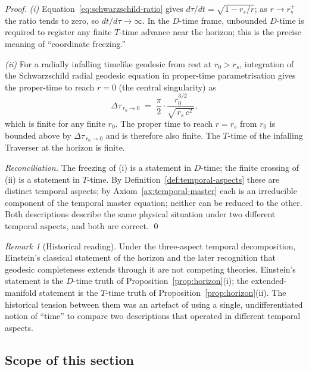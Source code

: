 \documentclass[11pt,a4paper]{article}
\theoremstyle{definition}
\theoremstyle{remark}
\newtheorem{remark}[theorem]{Remark}
\begin{document}
\begin{proof}
\emph{(i)} Equation~\eqref{eq:schwarzschild-ratio} gives $d\tau/dt = \sqrt{1 - r_{s}/r}$; as $r \to r_{s}^{+}$ the ratio tends to zero, so $dt/d\tau \to \infty$. In the $D$-time frame, unbounded $D$-time is required to register any finite $T$-time advance near the horizon; this is the precise meaning of ``coordinate freezing.''

\emph{(ii)} For a radially infalling timelike geodesic from rest at $r_{0} > r_{s}$, integration of the Schwarzschild radial geodesic equation in proper-time parametrisation gives the proper-time to reach $r=0$ (the central singularity) as
\[
\Delta\tau_{\,r_{0}\to 0} \;=\; \frac{\pi}{2}\cdot\frac{r_{0}^{3/2}}{\sqrt{\,r_{s}\,c^{2}\,}},
\]
which is finite for any finite $r_{0}$. The proper time to reach $r = r_{s}$ from $r_{0}$ is bounded above by $\Delta\tau_{\,r_{0}\to 0}$ and is therefore also finite. The $T$-time of the infalling Traverser at the horizon is finite.

\emph{Reconciliation.} The freezing of (i) is a statement in $D$-time; the finite crossing of (ii) is a statement in $T$-time. By Definition~\ref{def:temporal-aspects} these are distinct temporal aspects; by Axiom~\ref{ax:temporal-master} each is an irreducible component of the temporal master equation; neither can be reduced to the other. Both descriptions describe the same physical situation under two different temporal aspects, and both are correct. \qed
\end{proof}

\begin{remark}[Historical reading]\label{rem:horizon-historical}
Under the three-aspect temporal decomposition, Einstein's classical statement of the horizon and the later recognition that geodesic completeness extends through it are not competing theories. Einstein's statement is the $D$-time truth of Proposition~\ref{prop:horizon}(i); the extended-manifold statement is the $T$-time truth of Proposition~\ref{prop:horizon}(ii). The historical tension between them was an artefact of using a single, undifferentiated notion of ``time'' to compare two descriptions that operated in different temporal aspects.
\end{remark}

\subsection{Scope of this section}\label{subsec:temporal-scope}
\end{document}
